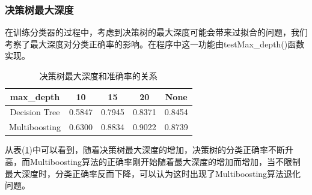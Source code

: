 \documentclass[a4paper,oneside,12pt]{article}
\begin{document}
\begin{spacing}{1.5}
\subsubsection{决策树最大深度}
在训练分类器的过程中，考虑到决策树的最大深度可能会带来过拟合的问题，我们考察了最大深度对分类正确率的影响。在程序中这一功能由testMax\_depth()函数实现。
\begin{table}[htbp]
 \caption{\label{tab6}决策树最大深度和准确率的关系}
 \center
 \begin{tabular}{ccccc}
  \toprule
   max\_depth &10 &15 & 20 & None  \\
  \midrule
 Decision Tree & 0.5847 & 0.7945 & 0.8371 & 0.8454 \\

 Multiboosting & 0.6300 & 0.8834 & 0.9022 & 0.8739 \\
  \bottomrule
 \end{tabular}
\end{table}
从表(\ref{tab6})中可以看到，随着决策树最大深度的增加，决策树的分类正确率不断升高，而Multiboosting算法的正确率刚开始随着最大深度的增加而增加，当不限制最大深度时，分类正确率反而下降，可以认为这时出现了Multiboosting算法退化问题。


\end{spacing}
\end{document}
